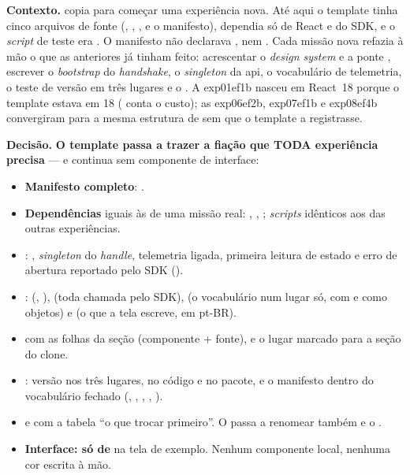 \textbf{Contexto.}  copia  para
começar uma experiência nova. Até aqui o template tinha cinco arquivos de fonte
(, , ,  e o
manifesto), dependia só de React e do SDK, e o \emph{script} de teste era
. O manifesto não declarava ,
 nem . Cada missão nova refazia à mão o que as
anteriores já tinham feito: acrescentar o \emph{design system} e a ponte
, escrever o \emph{bootstrap} do \emph{handshake}, o
\emph{singleton} da api, o vocabulário de telemetria, o teste de versão em três
lugares e o . A exp01ef1b nasceu em React~18 porque o template estava
em 18 ( conta o custo); as exp06ef2b, exp07ef1b e exp08ef4b convergiram para a
mesma estrutura de  sem que o template a registrasse.

\textbf{Decisão.} \textbf{O template passa a trazer a fiação que TODA
experiência precisa} --- e continua sem componente de interface:

\begin{itemize}
  \item \textbf{Manifesto completo}: .
  \item \textbf{Dependências} iguais às de uma missão real:
    , , ;
    \emph{scripts} idênticos aos das outras experiências.
  \item \textbf{}: , \emph{singleton}
    do \emph{handle}, telemetria ligada, primeira leitura de estado e erro de
    abertura reportado pelo SDK ().
  \item \textbf{}:  (, ),
     (toda chamada pelo SDK),  (o vocabulário
     num lugar só, com  e  como
    objetos) e  (o que a tela escreve, em pt-BR).
  \item \textbf{} com as folhas da seção 
    (componente + fonte), e o lugar marcado para a seção do clone.
  \item \textbf{}: versão nos três lugares,  no
    código e no pacote, e o manifesto dentro do vocabulário fechado
    (, , , ,
    ).
  \item \textbf{} e  com a tabela \enquote{o que
    trocar primeiro}. O  passa a renomear também 
    e o .
  \item \textbf{Interface: só  de } na tela de
    exemplo. Nenhum componente local, nenhuma cor escrita à mão.
\end{itemize}

